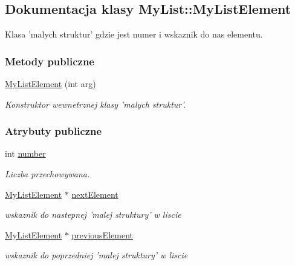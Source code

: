 \hypertarget{class_my_list_1_1_my_list_element}{\subsection{Dokumentacja klasy My\-List\-:\-:My\-List\-Element}
\label{class_my_list_1_1_my_list_element}
}


Klasa 'malych struktur' gdzie jest numer i wskaznik do nas elementu.  


\subsubsection*{Metody publiczne}
\begin{DoxyCompactItemize}
\item 
\hyperlink{class_my_list_1_1_my_list_element_ac57b6eddd2c28b199a87c3b2f8dda992}{My\-List\-Element} (int arg)
\begin{DoxyCompactList}\small\item\em Konstruktor wewnetrznej klasy 'malych struktur'. \end{DoxyCompactList}\end{DoxyCompactItemize}
\subsubsection*{Atrybuty publiczne}
\begin{DoxyCompactItemize}
\item 
int \hyperlink{class_my_list_1_1_my_list_element_acd6dbb6a8791f034f94678d46395b366}{number}
\begin{DoxyCompactList}\small\item\em Liczba przechowywana. \end{DoxyCompactList}\item 
\hyperlink{class_my_list_1_1_my_list_element}{My\-List\-Element} $\ast$ \hyperlink{class_my_list_1_1_my_list_element_abd7af673552c8876f210cbea01c5e949}{next\-Element}
\begin{DoxyCompactList}\small\item\em wskaznik do nastepnej 'malej struktury' w liscie \end{DoxyCompactList}\item 
\hyperlink{class_my_list_1_1_my_list_element}{My\-List\-Element} $\ast$ \hyperlink{class_my_list_1_1_my_list_element_adb7c0cbde93a90f30484637498690d0f}{previous\-Element}
\begin{DoxyCompactList}\small\item\em wskaznik do poprzedniej 'malej struktury' w liscie \end{DoxyCompactList}\end{DoxyCompactItemize}


